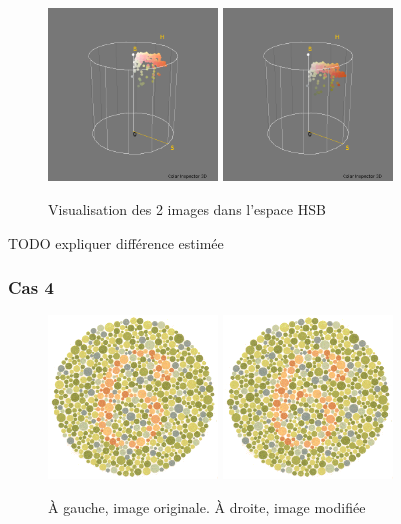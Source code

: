 \documentclass[a4paper]{article}
\begin{document}
\begin{figure}[H]
\begin{center}
\includegraphics[width=170px]{../resultats/e1_q1_k3_3.png}
\includegraphics[width=170px]{../resultats/e1_q1_k3_lumi.png}
\end{center}
\caption{Visualisation des 2 images dans l'espace HSB}
\end{figure}

TODO expliquer différence estimée

\clearpage
\subsubsection{Cas 4}

\begin{figure}[H]
\begin{center}
\includegraphics[width=170px]{../base/cas_4_dalton6.png}
\includegraphics[width=170px]{../base/cas_4_luminance.png}
\end{center}
\caption{À gauche, image originale. À droite, image modifiée}
\end{figure}
\end{document}
